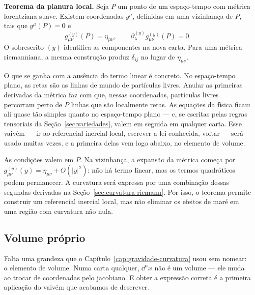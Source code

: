 \documentclass[12pt,a4paper,oneside]{book}
\theoremstyle{rgplain}
\theoremstyle{rgremark}
\begin{document}
\begin{central}
\textbf{Teorema da planura local.} Seja $P$ um ponto de um espaço-tempo com
métrica lorentziana suave. Existem coordenadas $y^\mu$, definidas em uma
vizinhança de $P$, tais que $y^\mu(P)=0$ e
\[
  g^{(y)}_{\mu\nu}(P)=\eta_{\mu\nu},
  \qquad
  \partial^{(y)}_\lambda g^{(y)}_{\mu\nu}(P)=0.
\]
O sobrescrito $(y)$ identifica as componentes na nova carta. Para uma métrica
riemanniana, a mesma construção produz $\delta_{ij}$ no lugar de $\eta_{\mu\nu}$.
\end{central}

O que se ganha com a ausência do termo linear é concreto. No espaço-tempo
plano, as retas são as linhas de mundo de partículas livres. Anular as
primeiras derivadas da métrica faz com que, nessas coordenadas, partículas
livres percorram perto de $P$ linhas que são localmente retas. As equações da
física ficam ali quase tão simples quanto no espaço-tempo plano --- e, se
escritas pelas regras tensoriais da Seção~\ref{sec:variedades}, valem em
seguida em qualquer carta. Esse vaivém --- ir ao referencial inercial local,
escrever a lei conhecida, voltar --- será usado muitas vezes, e a primeira
delas vem logo abaixo, no elemento de volume.

\begin{atencao}
As condições valem em $P$. Na vizinhança, a expansão da métrica começa por
$g^{(y)}_{\mu\nu}(y)=\eta_{\mu\nu}+O(|y|^2)$: não há termo linear, mas
os termos quadráticos podem permanecer. A curvatura será expressa por uma
combinação dessas segundas derivadas na
Seção~\ref{sec:curvatura-riemann}. Por isso, o teorema permite construir um
referencial inercial local, mas não eliminar os efeitos de maré em uma região
com curvatura não nula.
\end{atencao}

\subsection*{Volume próprio}

Falta uma grandeza que o Capítulo~\ref{cap:gravidade-curvatura} usou sem
nomear: o elemento de volume. Numa carta qualquer, $\dd^nx$ não é um volume
--- ele muda ao trocar de coordenadas pelo jacobiano. E obter a expressão
correta é a primeira aplicação do vaivém que acabamos de descrever.
\end{document}
